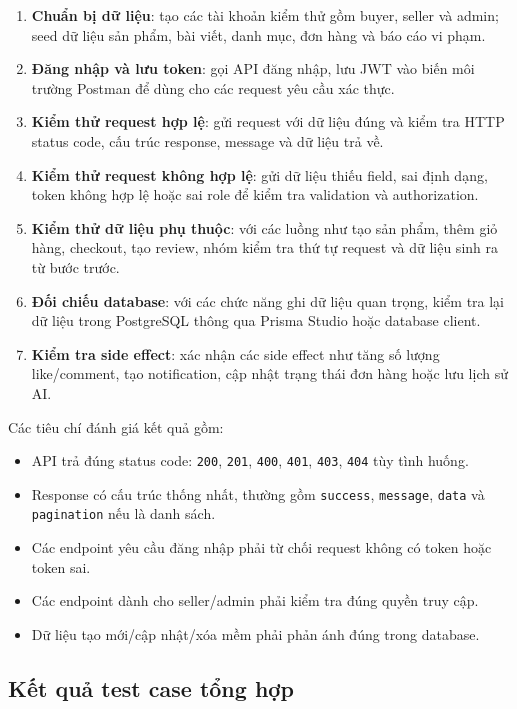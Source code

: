 \begin{enumerate}
    \item \textbf{Chuẩn bị dữ liệu}: tạo các tài khoản kiểm thử gồm buyer, seller và admin; seed dữ liệu sản phẩm, bài viết, danh mục, đơn hàng và báo cáo vi phạm.
    \item \textbf{Đăng nhập và lưu token}: gọi API đăng nhập, lưu JWT vào biến môi trường Postman để dùng cho các request yêu cầu xác thực.
    \item \textbf{Kiểm thử request hợp lệ}: gửi request với dữ liệu đúng và kiểm tra HTTP status code, cấu trúc response, message và dữ liệu trả về.
    \item \textbf{Kiểm thử request không hợp lệ}: gửi dữ liệu thiếu field, sai định dạng, token không hợp lệ hoặc sai role để kiểm tra validation và authorization.
    \item \textbf{Kiểm thử dữ liệu phụ thuộc}: với các luồng như tạo sản phẩm, thêm giỏ hàng, checkout, tạo review, nhóm kiểm tra thứ tự request và dữ liệu sinh ra từ bước trước.
    \item \textbf{Đối chiếu database}: với các chức năng ghi dữ liệu quan trọng, kiểm tra lại dữ liệu trong PostgreSQL thông qua Prisma Studio hoặc database client.
    \item \textbf{Kiểm tra side effect}: xác nhận các side effect như tăng số lượng like/comment, tạo notification, cập nhật trạng thái đơn hàng hoặc lưu lịch sử AI.
\end{enumerate}

Các tiêu chí đánh giá kết quả gồm:

\begin{itemize}
    \item API trả đúng status code: \texttt{200}, \texttt{201}, \texttt{400}, \texttt{401}, \texttt{403}, \texttt{404} tùy tình huống.
    \item Response có cấu trúc thống nhất, thường gồm \texttt{success}, \texttt{message}, \texttt{data} và \texttt{pagination} nếu là danh sách.
    \item Các endpoint yêu cầu đăng nhập phải từ chối request không có token hoặc token sai.
    \item Các endpoint dành cho seller/admin phải kiểm tra đúng quyền truy cập.
    \item Dữ liệu tạo mới/cập nhật/xóa mềm phải phản ánh đúng trong database.
\end{itemize}

\subsection{Kết quả test case tổng hợp}

